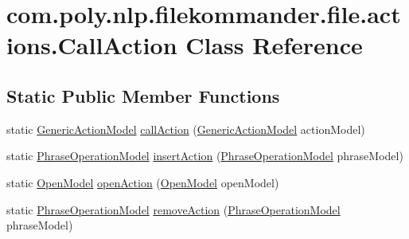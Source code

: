 \hypertarget{classcom_1_1poly_1_1nlp_1_1filekommander_1_1file_1_1actions_1_1_call_action}{\section{com.\-poly.\-nlp.\-filekommander.\-file.\-actions.\-Call\-Action Class Reference}
\label{classcom_1_1poly_1_1nlp_1_1filekommander_1_1file_1_1actions_1_1_call_action}
}
\subsection*{Static Public Member Functions}
\begin{DoxyCompactItemize}
\item 
static \hyperlink{interfacecom_1_1poly_1_1nlp_1_1filekommander_1_1views_1_1models_1_1_generic_action_model}{Generic\-Action\-Model} \hyperlink{classcom_1_1poly_1_1nlp_1_1filekommander_1_1file_1_1actions_1_1_call_action_a0e736328e4851dfb78f0578dd0414029}{call\-Action} (\hyperlink{interfacecom_1_1poly_1_1nlp_1_1filekommander_1_1views_1_1models_1_1_generic_action_model}{Generic\-Action\-Model} action\-Model)
\item 
static \hyperlink{classcom_1_1poly_1_1nlp_1_1filekommander_1_1views_1_1models_1_1_phrase_operation_model}{Phrase\-Operation\-Model} \hyperlink{classcom_1_1poly_1_1nlp_1_1filekommander_1_1file_1_1actions_1_1_call_action_adfcc0c66568ec9741ea5e31e3e01a6a7}{insert\-Action} (\hyperlink{classcom_1_1poly_1_1nlp_1_1filekommander_1_1views_1_1models_1_1_phrase_operation_model}{Phrase\-Operation\-Model} phrase\-Model)
\item 
static \hyperlink{classcom_1_1poly_1_1nlp_1_1filekommander_1_1views_1_1models_1_1_open_model}{Open\-Model} \hyperlink{classcom_1_1poly_1_1nlp_1_1filekommander_1_1file_1_1actions_1_1_call_action_a7fb9cae998e1f8596e02046de58fd1c6}{open\-Action} (\hyperlink{classcom_1_1poly_1_1nlp_1_1filekommander_1_1views_1_1models_1_1_open_model}{Open\-Model} open\-Model)
\item 
static \hyperlink{classcom_1_1poly_1_1nlp_1_1filekommander_1_1views_1_1models_1_1_phrase_operation_model}{Phrase\-Operation\-Model} \hyperlink{classcom_1_1poly_1_1nlp_1_1filekommander_1_1file_1_1actions_1_1_call_action_ab396ed906e943060dd09fae42b6d473c}{remove\-Action} (\hyperlink{classcom_1_1poly_1_1nlp_1_1filekommander_1_1views_1_1models_1_1_phrase_operation_model}{Phrase\-Operation\-Model} phrase\-Model)

\end{DoxyCompactItemize}
